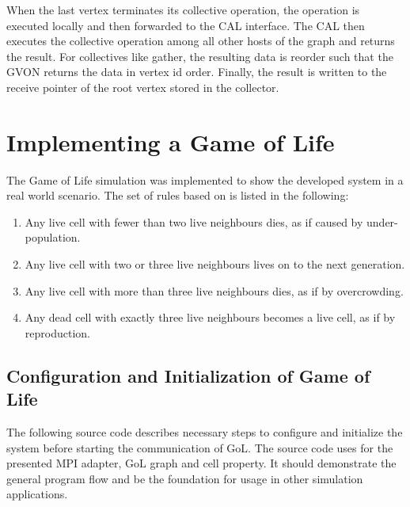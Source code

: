 When the last vertex terminates its collective operation, the
operation is executed locally and then forwarded to the CAL
interface. The CAL then executes the collective operation among all
other hosts of the graph and returns the result. For collectives like
gather, the resulting data is reorder such that the GVON returns the
data in vertex id order. Finally, the result is written to the receive
pointer of the root vertex stored in the collector.



\section{Implementing a Game of Life}
\label{sec:impl:gol}
The Game of Life simulation was implemented to show the developed
system in a real world scenario. The set of rules based on \cite{ref:gol_rules}
is listed in the following:

\begin{enumerate}
\item Any live cell with fewer than two live neighbours dies, as if caused by under-population.
\item Any live cell with two or three live neighbours lives on to the next generation.
\item Any live cell with more than three live neighbours dies, as if by overcrowding.
\item Any dead cell with exactly three live neighbours becomes a live cell, as if by reproduction.
\end{enumerate}

\subsection{Configuration and Initialization of Game of Life}
The following source code describes necessary steps to configure and
initialize the system before starting the communication of GoL. The
source code uses for the presented MPI adapter, GoL graph and
cell property. It should demonstrate the general program flow and be
the foundation for usage in other simulation applications.

